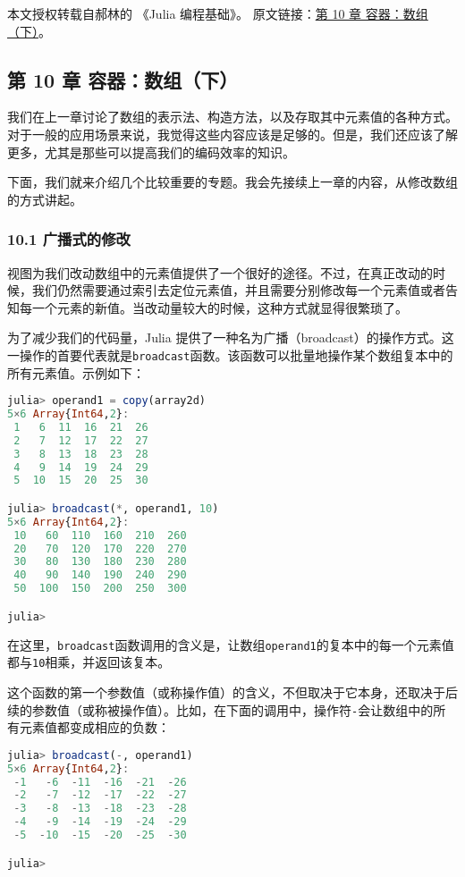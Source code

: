
本文授权转载自郝林的 《Julia 编程基础》。 原文链接：\href{https://github.com/hyper0x/JuliaBasics/blob/master/book/ch10.md}{第 10 章 容器：数组（下）}。


\subsection{第 10 章 容器：数组（下）}

我们在上一章讨论了数组的表示法、构造方法，以及存取其中元素值的各种方式。对于一般的应用场景来说，我觉得这些内容应该是足够的。但是，我们还应该了解更多，尤其是那些可以提高我们的编码效率的知识。

下面，我们就来介绍几个比较重要的专题。我会先接续上一章的内容，从修改数组的方式讲起。

\subsubsection{10.1 广播式的修改}

视图为我们改动数组中的元素值提供了一个很好的途径。不过，在真正改动的时候，我们仍然需要通过索引去定位元素值，并且需要分别修改每一个元素值或者告知每一个元素的新值。当改动量较大的时候，这种方式就显得很繁琐了。

为了减少我们的代码量，Julia 提供了一种名为广播（broadcast）的操作方式。这一操作的首要代表就是\verb|broadcast|函数。该函数可以批量地操作某个数组复本中的所有元素值。示例如下：

\begin{lstlisting}[language=julia]
julia> operand1 = copy(array2d)
5×6 Array{Int64,2}:
 1   6  11  16  21  26
 2   7  12  17  22  27
 3   8  13  18  23  28
 4   9  14  19  24  29
 5  10  15  20  25  30

julia> broadcast(*, operand1, 10)
5×6 Array{Int64,2}:
 10   60  110  160  210  260
 20   70  120  170  220  270
 30   80  130  180  230  280
 40   90  140  190  240  290
 50  100  150  200  250  300

julia> 
\end{lstlisting}

在这里，\verb|broadcast|函数调用的含义是，让数组\verb|operand1|的复本中的每一个元素值都与\verb|10|相乘，并返回该复本。

这个函数的第一个参数值（或称操作值）的含义，不但取决于它本身，还取决于后续的参数值（或称被操作值）。比如，在下面的调用中，操作符\verb|-|会让数组中的所有元素值都变成相应的负数：

\begin{lstlisting}[language=julia]
julia> broadcast(-, operand1)
5×6 Array{Int64,2}:
 -1   -6  -11  -16  -21  -26
 -2   -7  -12  -17  -22  -27
 -3   -8  -13  -18  -23  -28
 -4   -9  -14  -19  -24  -29
 -5  -10  -15  -20  -25  -30

julia> 
\end{lstlisting}

